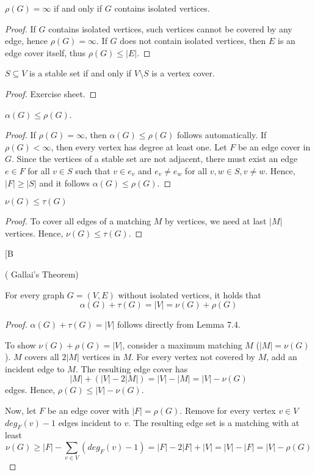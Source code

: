 \begin{lem}
$\rho(G) = \infty$ if and only if $G$ contains isolated vertices.
\end{lem}
\begin{proof}
If $G$ contains isolated vertices, such vertices cannot be covered by any
edge, hence $\rho(G) = \infty$. If $G$ does not contain isolated vertices,
then $E$ is an edge cover itself, thus $\rho(G) \leq |E|$.
\end{proof}

\begin{lem} %
$S \subseteq V$ is a stable set if and only if $V \setminus S$ is a vertex
cover.
\end{lem}
\begin{proof}
Exercise sheet.
\end{proof}

\begin{lem} %
$\alpha(G) \leq \rho(G)$.
\end{lem}
\begin{proof}
If $\rho(G) = \infty$, then $\alpha(G) \leq \rho(G)$ follows automatically.
If $\rho(G) < \infty$, then every vertex has degree at least one. Let $F$ be
an edge cover in $G$. Since the vertices of a stable set are not adjacent,
there must exist an edge $e \in F$ for all $v \in S$ such that $v \in e_v$
and $e_v \neq e_w$ for all $v, w \in S, v \neq w$. Hence, $|F| \geq |S|$ and
it follows $\alpha(G) \leq \rho(G)$.
\end{proof}

\begin{lem} %
$\nu(G) \leq \tau(G)$
\end{lem}
\begin{proof}
To cover all edges of a matching $M$ by vertices, we need at last $|M|$
vertices. Hence, $\nu(G) \leq \tau(G)$.
\end{proof}
[B
\begin{thm} %
( Gallai's Theorem)

For every graph $G = (V, E)$ without isolated vertices, it holds that
\[
\alpha(G) + \tau(G) = |V| = \nu(G) + \rho(G)
\]
\end{thm}
\begin{proof}
$\alpha(G) + \tau(G) = |V|$ follows directly from Lemma 7.4.

To show $\nu(G) + \rho(G) = |V|$, consider a maximum matching $M$ ($|M| =
\nu(G)$). $M$ covers all $2 |M|$ vertices in $M$. For every vertex not
covered by $M$, add an incident edge to $M$. The resulting edge cover has
\[
|M| + (|V| - 2 |M|) = |V| - |M| = |V| - \nu(G)
\] edges. Hence, $\rho(G) \leq
|V| - \nu(G)$.

Now, let $F$ be an edge cover with $|F| = \rho(G)$. Remove for every vertex
$v \in V$ $deg_F(v) - 1$ edges incident to $v$. The resulting edge set is a
matching with at least
\[
\nu(G) \geq |F| - \sum\limits_{v \in V} (deg_F(v) - 1) = |F| - 2 |F| + |V| = |V| - |F|
= |V| - \rho(G)
\]
\end{proof}

